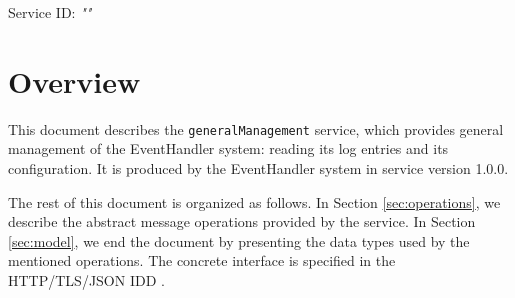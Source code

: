 \documentclass[a4paper]{arrowhead}
\begin{document}
\sloppy

\ArrowheadSetup

\begin{center}
  \vspace*{1cm}
  \huge{\arrowtitle}

  \vspace*{0.2cm}
  \LARGE{\arrowtype}
  \vspace*{1cm}

  \Large{Service ID: \textit{"\arrowid"}}

  \vspace*{\fill}


  \vspace*{1cm}
  \vspace*{\fill}

  \begin{abstract}
    This document describes the \texttt{generalManagement} service, version 1.0.0, produced by the EventHandler support system of Arrowhead 5.2.2.
  \end{abstract}

  \vspace*{1cm}
\end{center}

\newpage

\tableofcontents
\newpage

\section{Overview}
\label{sec:overview}

This document describes the \texttt{generalManagement} service, which provides general management of the EventHandler system: reading its log entries and its configuration.
It is produced by the EventHandler system \cite{eh-sysd} in service version 1.0.0.

The rest of this document is organized as follows.
In Section \ref{sec:operations}, we describe the abstract message operations provided by the service.
In Section \ref{sec:model}, we end the document by presenting the data types used by the mentioned operations.
The concrete interface is specified in the HTTP/TLS/JSON IDD \cite{eh-generalManagement-http-idd}.
\end{document}
